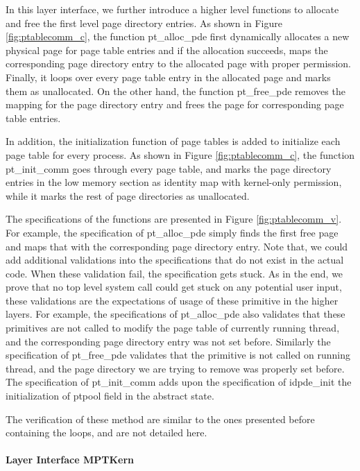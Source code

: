 In this layer interface, we further introduce a higher level functions to allocate
and free the first level page directory entries.
As shown in Figure \ref{fig:ptablecomm_c}, the function \textsf{pt\_alloc\_pde}
first dynamically allocates a new physical page for page table entries and if the
allocation succeeds, maps the corresponding page directory entry to the allocated
page with proper permission. Finally, it loops over every page table entry in the allocated
page and marks them as unallocated. On the other hand, the function
\textsf{pt\_free\_pde} removes the mapping for the page directory entry and
frees the page for corresponding page table entries.

In addition, the initialization function of page tables is added to initialize each page table
for every process. As shown in Figure \ref{fig:ptablecomm_c}, the function
\textsf{pt\_init\_comm} goes through every page table, and marks the page directory
entries in the low memory section as identity map with kernel-only permission, while
it marks the rest of page directories as unallocated.

The specifications of the functions are presented in Figure \ref{fig:ptablecomm_v}.
For example, the specification of \textsf{pt\_alloc\_pde} simply finds the first free
page and maps that with the corresponding page directory entry. Note that, we could
add additional validations into the specifications that do not exist in the actual code.
When these validation fail, the specification gets stuck. As in the end, we prove that
no top level system call could get stuck on any potential user input, these validations
are the expectations of usage of these primitive in the higher layers.
For example, the specifications of \textsf{pt\_alloc\_pde}
also validates that these primitives are not called to modify the page table of currently
running thread, and the corresponding page directory entry was not set before.
Similarly the specification of \textsf{pt\_free\_pde} validates that the primitive is not
called on running thread, and the page directory we are trying to remove was properly
set before. The specification of \textsf{pt\_init\_comm} adds upon the specification
of \textsf{idpde\_init} the initialization of \textsf{ptpool} field in the abstract state.


The verification of these method are similar to the ones presented before containing the loops, and are not detailed here.

\paragraph{Layer Interface MPTKern}

